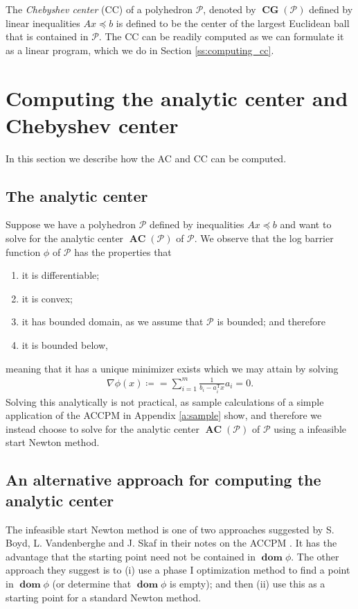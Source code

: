 \documentclass[11pt]{amsart}
\theoremstyle{definition}
\theoremstyle{remark}
\newcommand{\transpose}{\text{T}}
\DeclareMathOperator{\domain}{\textbf{dom}}
\DeclareMathOperator{\CG}{\textbf{CG}}
\DeclareMathOperator{\AC}{\textbf{AC}}
\begin{document}
        The \emph{Chebyshev center} (CC) of a polyhedron $\mathcal{P}$, denoted by $\CG(\mathcal{P})$ defined by linear inequalities $Ax \preceq b$ is defined to be the center of the largest Euclidean ball that is contained in $\mathcal{P}$. The CC can be readily computed as we can formulate it as a linear program, which we do in Section \ref{ss:computing_cc}.  


\section{Computing the analytic center and Chebyshev center}
    In this section we describe how the AC and CC can be computed.
    \subsection{The analytic center}\label{ss:computing_ac}
        Suppose we have a polyhedron $\mathcal{P}$ defined by inequalities $Ax \preceq b$ and want to solve for the analytic center $\AC(\mathcal{P})$ of $\mathcal{P}$. We observe that the log barrier function $\phi$ of $\mathcal{P}$ has the properties that 
        \begin{enumerate}
            \item it is differentiable; 
            \item it is convex;
            \item it has bounded domain, as we assume that $\mathcal{P}$ is bounded; and therefore
            \item it is bounded below, 
        \end{enumerate}
        meaning that it has a unique minimizer exists which we may attain by solving
        \begin{align*}
            \nabla \phi(x) \coloneqq = \sum_{i=1}^{m} \frac{1}{b_i - a_i^\transpose x}a_i = 0.     
        \end{align*} 
        Solving this analytically is not practical, as sample calculations of a simple application of the ACCPM in Appendix \ref{a:sample} show, and therefore we instead choose to solve for the analytic center $\AC(\mathcal{P})$ of $\mathcal{P}$ using a infeasible start Newton method. 

    \subsection{An alternative approach for computing the analytic center}
        The infeasible start Newton method is one of two approaches suggested by S. Boyd, L. Vandenberghe and J. Skaf in their notes on the ACCPM \cite[p. 3]{BVS08}. It has the advantage that the starting point need not be contained in $\domain \phi$. The other approach they suggest is to (i) use a phase I optimization method \cite[Section 11.4]{BV04} to find a point in $\domain \phi$ (or determine that $\domain \phi$ is empty); and then (ii) use this as a starting point for a standard Newton method. 
\end{document}
